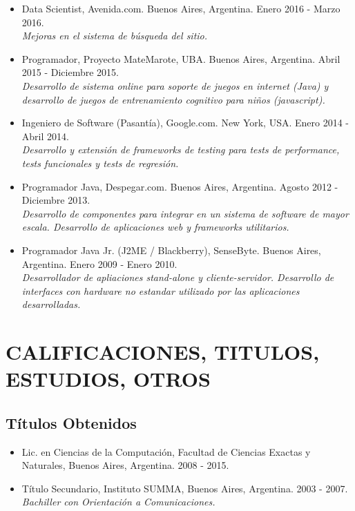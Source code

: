 \documentclass[a4paper,10pt]{article}
\begin{document}
\begin{itemize}
    \item {Data Scientist, Avenida.com. Buenos Aires, Argentina.
            Enero 2016 - Marzo 2016. \\
            {\small \itshape Mejoras en el sistema de búsqueda del sitio.}}

    \item {Programador, Proyecto MateMarote, UBA. Buenos Aires, Argentina.
            Abril 2015 - Diciembre 2015. \\
            {\small \itshape Desarrollo de sistema online para soporte de
        juegos en internet (Java) y desarrollo de juegos de entrenamiento
cognitivo para niños (javascript).}}

    \item {Ingeniero de Software (Pasantía), Google.com. New York, USA. Enero
            2014 - Abril 2014. \\ 
    {\small \itshape Desarrollo y extensión de frameworks de testing para tests
de performance, tests funcionales y tests de regresión.}}

    \item {Programador Java, Despegar.com. Buenos Aires, Argentina. Agosto 2012
           - Diciembre 2013. \\
    {\small \itshape Desarrollo de componentes para integrar en un sistema de
software de mayor escala. Desarrollo de aplicaciones web y frameworks
utilitarios.}}

    \item {Programador Java Jr. (J2ME / Blackberry), SenseByte. Buenos Aires,
            Argentina. Enero 2009 - Enero 2010. \\ 
    {\small \itshape Desarrollador de apliaciones stand-alone y
cliente-servidor.  Desarrollo de interfaces con hardware no estandar utilizado
por las aplicaciones desarrolladas.}}

\end{itemize}

\section{CALIFICACIONES, TITULOS, ESTUDIOS, OTROS}

\subsection{Títulos Obtenidos}

\begin{itemize}
    \item {Lic. en Ciencias de la Computación, Facultad de Ciencias Exactas y
        Naturales, Buenos Aires, Argentina. 2008 - 2015.}
    \item {Título Secundario, Instituto SUMMA, Buenos Aires, Argentina. 2003
            - 2007. \\
        {\small \itshape Bachiller con Orientación a Comunicaciones.}}
\end{itemize}
\end{document}
